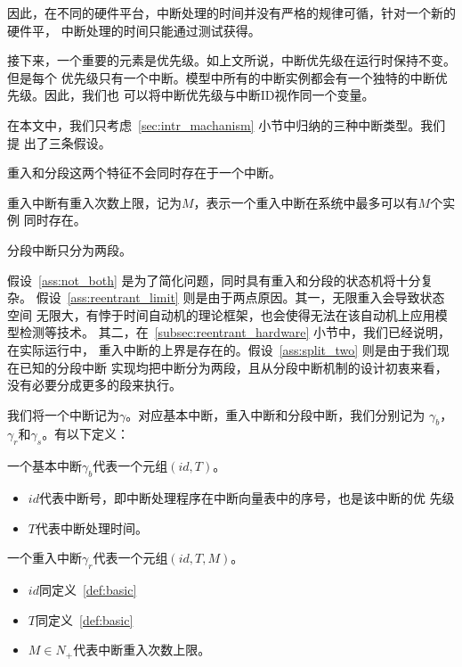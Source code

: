 因此，在不同的硬件平台，中断处理的时间并没有严格的规律可循，针对一个新的硬件平，
中断处理的时间只能通过测试获得。

接下来，一个重要的元素是优先级。如上文所说，中断优先级在运行时保持不变。但是每个
优先级只有一个中断。模型中所有的中断实例都会有一个独特的中断优先级。因此，我们也
可以将中断优先级与中断ID视作同一个变量。

在本文中，我们只考虑~\ref{sec:intr_machanism} 小节中归纳的三种中断类型。我们提
出了三条假设。

\begin{assumption}
	\label{ass:not_both}
	重入和分段这两个特征不会同时存在于一个中断。
\end{assumption}

\begin{assumption}
	\label{ass:reentrant_limit}
	重入中断有重入次数上限，记为$M$，表示一个重入中断在系统中最多可以有$M$个实例
	同时存在。
\end{assumption}

\begin{assumption}
	\label{ass:split_two}
	分段中断只分为两段。
\end{assumption}

假设~\ref{ass:not_both} 是为了简化问题，同时具有重入和分段的状态机将十分复杂。
假设~\ref{ass:reentrant_limit} 则是由于两点原因。其一，无限重入会导致状态空间
无限大，有悖于时间自动机的理论框架，也会使得无法在该自动机上应用模型检测等技术。
其二，在~\ref{subsec:reentrant_hardware} 小节中，我们已经说明，在实际运行中，
重入中断的上界是存在的。假设~\ref{ass:split_two} 则是由于我们现在已知的分段中断
实现均把中断分为两段，且从分段中断机制的设计初衷来看，没有必要分成更多的段来执行。

我们将一个中断记为$\gamma$。对应基本中断，重入中断和分段中断，我们分别记为
$\gamma_b$，$\gamma_r$和$\gamma_s$。有以下定义：

\begin{definition}
	\label{def:basic}
	一个基本中断$\gamma_b$代表一个元组$(id, T)$。
	\begin{itemize}
		\item $id$代表中断号，即中断处理程序在中断向量表中的序号，也是该中断的优
		先级
		\item $T$代表中断处理时间。
	\end{itemize}
\end{definition}

\begin{definition}
	\label{def:reentrant}
	一个重入中断$\gamma_r$代表一个元组$(id, T, M)$。
	\begin{itemize}
		\item $id$同定义~\ref{def:basic}
		\item $T$同定义~\ref{def:basic}
		\item $M\in N_+$代表中断重入次数上限。
	\end{itemize}
\end{definition}

